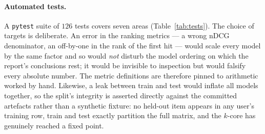 \documentclass[12pt,a4paper]{article}
\newcommand{\ndcg}{nDCG}
\begin{document}
\paragraph{Automated tests.} A \texttt{pytest} suite of $126$ tests covers seven areas
(Table~\ref{tab:tests}). The choice of targets is deliberate. An error in the ranking
metrics --- a wrong \ndcg{} denominator, an off-by-one in the rank of the first hit ---
would scale every model by the same factor and so would \emph{not} disturb the model
ordering on which the report's conclusions rest; it would be invisible to inspection but
would falsify every absolute number. The metric definitions are therefore pinned to
arithmetic worked by hand. Likewise, a leak between train and test would inflate all
models together, so the split's integrity is asserted directly against the committed
artefacts rather than a synthetic fixture: no held-out item appears in any user's
training row, train and test exactly partition the full matrix, and the $k$-core has
genuinely reached a fixed point.
\end{document}
